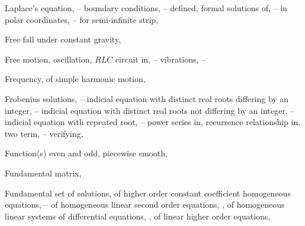 \begin{theindex}
  \item Laplace's equation, \pageref{eq:12.3.1}--\pageref{exer:12.4.7}
    \subitem boundary conditions, \pageref{eq:12.3.1}--\pageref{exer:12.3.1}
    \subitem defined, \pageref{eq:12.3.2}
    \subitem formal solutions of, \pageref{example:12.3.1}--\pageref{exer:12.3.1}
    \subitem in polar coordinates, \pageref{eq:12.4.1}--\pageref{exer:12.4.7}
    \subitem for semi-infinite strip, \pageref{eq:12.3.24}

  \item Free fall under constant gravity, \pageref{example:1.2.8}

  \item Free motion, \pageref{eq:6.1.1}
    \subitem oscillation, $RLC$ circuit in, \pageref{eq:6.3.8}--\pageref{example:6.3.1}
    \subitem vibrations, \pageref{eq:6.2.1}--\pageref{eq:6.2.11}

  \item Frequency, \pageref{eq:6.2.3}
    \subitem of simple harmonic motion, \pageref{example:6.3.1}

  \item Frobenius solutions, \pageref{eq:7.5.1}--\pageref{exer:7.7.48}
    \subitem indicial equation with distinct real roots differing by an integer, \pageref{eq:7.7.1}--\pageref{exer:7.7.48}
    \subitem indicial equation with distinct real roots not differing by an integer, \pageref{thmtype:7.5.3}--\pageref{exer:7.5.68}
    \subitem indicial equation with repeated root, \pageref{eq:7.6.1}--\pageref{exer:7.6.66}
    \subitem power series in, \pageref{eq:7.5.2}
    \subitem recurrence relationship in, \pageref{thmtype:7.5.2}
      \subsubitem two term, \pageref{eq:7.5.20}--\pageref{eq:7.5.26}
    \subitem verifying, \pageref{eq:7.5.27}

  \item Function(s)
    \subitem even and odd, \pageref{example:11.2.2}
    \subitem piecewise smooth, \pageref{thmtype:11.2.3}

  \item Fundamental matrix, \pageref{thmtype:10.3.3}

  \item Fundamental set of solutions, of higher order constant coefficient homogeneous equations, \pageref{thmtype:9.2.1}--\pageref{exer:9.2.1}
    \subitem of homogeneous linear second order equations, \pageref{eq:5.1.19}, \pageref{thmtype:5.1.6}
    \subitem of homogeneous linear systems of differential equations, \pageref{thmtype:10.3.1}, \pageref{thmtype:10.3.3}
    \subitem of linear higher order equations, \pageref{thmtype:9.1.2} 


\end{theindex}
